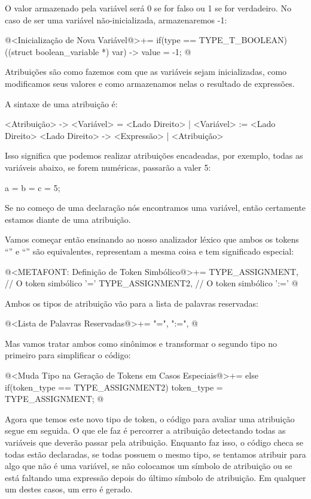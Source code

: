 O valor  armazenado pela variável será 0 se for
falso ou 1 se for verdadeiro. No caso de ser uma variável
não-inicializada, armazenaremos -1:

\iniciocodigo
@<Inicialização de Nova Variável@>+=
if(type == TYPE_T_BOOLEAN)
  ((struct boolean_variable *) var) -> value = -1;
@
\fimcodigo



Atribuições são como fazemos com que as variáveis sejam inicializadas,
como modificamos seus valores e como armazenamos nelas o resultado de
expressões.

A sintaxe de uma atribuição é:

\alinhaverbatim
<Atribuição> -> <Variável> = <Lado Direito> |
                <Variável> := <Lado Direito>
<Lado Direito> -> <Expressão> | <Atribuição>
\alinhanormal

Isso significa que podemos realizar atribuições encadeadas, por
exemplo, todas as variáveis abaixo, se forem numéricas, passarão a
valer 5:

\alinhaverbatim
a = b = c = 5;
\alinhanormal

Se no começo de uma declaração nós encontramos uma variável, então
certamente estamos diante de uma atribuição.

Vamos começar então ensinando ao nosso analizador léxico que ambos os
tokens ``\monoespaco{=}'' e ``\monoespaco{:=}'' são equivalentes,
representam a mesma coisa e tem significado especial:

\iniciocodigo
@<METAFONT: Definição de Token Simbólico@>+=
TYPE_ASSIGNMENT,            // O token simbólico '='
TYPE_ASSIGNMENT2,           // O token simbólico ':='
@
\fimcodigo

Ambos os tipos de atribuição vão para a lista de palavras reservadas:

\iniciocodigo
@<Lista de Palavras Reservadas@>+=
"=", ":=",
@
\fimcodigo

Mas vamos tratar ambos como sinônimos e transformar o segundo tipo no
primeiro para simplificar o código:

\iniciocodigo
@<Muda Tipo na Geração de Tokens em Casos Especiais@>+=
else if(token_type == TYPE_ASSIGNMENT2)
  token_type = TYPE_ASSIGNMENT;
@
\fimcodigo

Agora que temos este novo tipo de token, o código para avaliar uma
atribuição segue em seguida. O que ele faz é percorrer a atribuição
detectando todas as variáveis que deverão passar pela
atribuição. Enquanto faz isso, o código checa se todas estão
declaradas, se todas possuem o mesmo tipo, se tentamos atribuir para
algo que não é uma variável, se não colocamos um símbolo de atribuição
ou se está faltando uma expressão depois do último símbolo de
atribuição. Em qualquer um destes casos, um erro é gerado.

